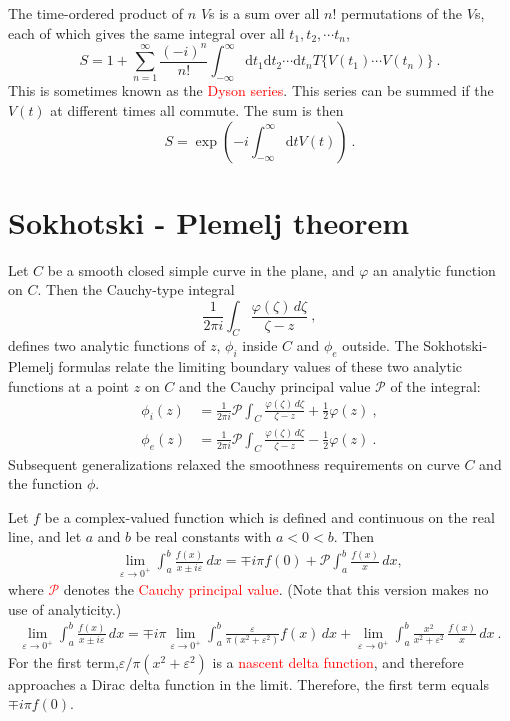 \documentclass[11pt,a4paper]{article}
\newcommand{\dif}{\mathrm{d}}
\begin{document}
The time-ordered product of $n$ $V$s is a sum over all $n!$ permutations of the $V$s, each of which gives the same integral over all $t_1, t_2, \cdots t_n$, 
\begin{equation}
S = 1 + \sum_{n=1}^\infty \dfrac{(-i)^n}{n!} \int_{-\infty}^\infty \dif t_1 \dif t_2 \cdots \dif t_n T\{V(t_1) \cdots V(t_n) \} ~.
\end{equation}
This is sometimes known as the \textcolor{red}{Dyson series}. This series can be summed if the $V(t)$ at different times all commute. The sum is then
\begin{equation}
S = \exp \left(-i \int_{-\infty}^\infty \dif t V(t)  \right) ~.
\end{equation}


\section{Sokhotski - Plemelj theorem}
Let $C$ be a smooth closed simple curve in the plane, and ${\displaystyle \varphi }$ an analytic function on $C$. Then the Cauchy-type integral
\begin{equation}
{\frac {1}{2\pi i}}\int _{C}{\frac {\varphi (\zeta )\,d\zeta }{\zeta -z}} ~,
\end{equation}
defines two analytic functions of $z$, $\phi _{i}$ inside $C$ and $\phi _{e}$ outside. The Sokhotski-Plemelj formulas relate the limiting boundary values of these two analytic functions at a point $z$ on $C$ and the Cauchy principal value ${\mathcal {P}}$ of the integral:
\begin{align}
\phi_{i}(z) &= {\frac {1}{2\pi i}}{\mathcal {P}}\int _{C}{\frac {\varphi (\zeta )\,d\zeta }{\zeta -z}}+{\frac {1}{2}}\varphi (z) ~, \\
\phi_{e}(z) &= {\frac {1}{2\pi i}}{\mathcal {P}}\int _{C}{\frac {\varphi (\zeta )\,d\zeta }{\zeta -z}}-{\frac {1}{2}}\varphi (z) ~.
\end{align}
Subsequent generalizations relaxed the smoothness requirements on curve $C$ and the function $\phi$.

Let $f$ be a complex-valued function which is defined and continuous on the real line, and let $a$ and $b$ be real constants with $a < 0 <  b$. Then
\begin{align}
\lim_{\varepsilon \rightarrow 0^{+}}\int_{a}^{b}{\frac {f(x)}{x\pm i\varepsilon }}\,dx=\mp i\pi f(0)+{\mathcal {P}}\int_{a}^{b}{\frac {f(x)}{x}}\,dx,
\end{align}
where \textcolor{red}{$\mathcal {P}$} denotes the \textcolor{red}{Cauchy principal value}. (Note that this version makes no use of analyticity.)
\begin{align}
\lim_{\varepsilon \rightarrow 0^{+}} \int_{a}^{b}{\frac {f(x)}{x\pm i\varepsilon }}\,dx = \mp i\pi \lim_{\varepsilon \rightarrow 0^{+}} \int_{a}^{b}{\frac {\varepsilon }{\pi (x^{2}+\varepsilon ^{2})}}f(x)\,dx + \lim_{\varepsilon \rightarrow 0^{+}}\int _{a}^{b}{\frac {x^{2}}{x^{2}+\varepsilon ^{2}}}\,{\frac {f(x)}{x}}\,dx ~.
\end{align}
For the first term, ​$\varepsilon/\pi(x^2 + \varepsilon^2)$ is a \textcolor{red}{nascent delta function}, and therefore approaches a Dirac delta function in the limit. Therefore, the first term equals $\mp i\pi  f(0)$.
\end{document}
